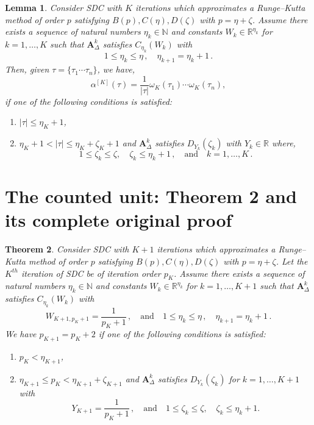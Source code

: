 \documentclass[10pt,a4paper]{amsart}
\newcommand{\reva}[1]{#1}%
\theoremstyle{plain}
\newtheorem{theorem}{Theorem}
\newtheorem{lemma}[theorem]{Lemma}
\theoremstyle{definition}
\theoremstyle{remark}
\begin{document}
\begin{lemma}\label{lemma:ai_gen_form}
    Consider SDC with $K$ iterations which approximates a \reva{Runge--Kutta method of order $p$ satisfying $B(p), C(\eta), D(\zeta)$ with $p = \eta + \zeta$. Assume there exists a sequence of natural numbers $\eta_k \in \mathbb{N}$ and constants $W_k \in \mathbb{R}^{\eta_k}$ for $k=1,\dots, K$ such that $\bm{A}^k_\Delta$ satisfies $C_{\eta_k}(W_k)$ with
    \[ 1 \leq \eta_k \leq \eta \,, \quad \eta_{k+1} = \eta_k + 1 \,. \]
    Then, given $\tau = \{\tau_1 \cdots \tau_n\}$, we have,
    \begin{equation}\label{eq:ai_gen_form}
        \alpha^{[K]} (\tau) = \frac{1}{|\tau|} \omega_K (\tau_1) \cdots \omega_K (\tau_n),
    \end{equation}
    if one of the following conditions is satisfied:
    \begin{enumerate}
        \item $|\tau| \leq \eta_K + 1$,
        \item $\eta_K + 1 < |\tau| \leq \eta_K + \zeta_K + 1$ and $\bm{A}_\Delta^k$ satisfies $D_{Y_k}(\zeta_k)$ with $Y_k \in \mathbb{R}$ where,
            \[ 1 \leq \zeta_k \leq \zeta, \quad \zeta_k \leq \eta_k + 1 \,, \quad \text{and} \quad k = 1, \dots, K \,. \]
    \end{enumerate}}
\end{lemma}


\section{The counted unit: Theorem 2 and its complete original proof}

\begin{theorem}
    \label{thm:order_jump}
    Consider SDC with $K+1$ iterations which approximates a \reva{Runge--Kutta method of order $p$ satisfying $B(p), C(\eta), D(\zeta)$ with $p = \eta + \zeta$. Let the $K^{th}$ iteration of SDC be of iteration order $p_K$. Assume there exists a sequence of natural numbers $\eta_k \in \mathbb{N}$ and constants $W_k \in \mathbb{R}^{\eta_k}$ for $k=1,\dots, K+1$ such that $\bm{A}^k_\Delta$ satisfies $C_{\eta_k}(W_k)$ with
    \[ W_{K+1,p_K + 1} = \frac{1}{p_K + 1} \,, \quad \text{and} \quad 1 \leq \eta_k \leq \eta \,, \quad \eta_{k+1} = \eta_k + 1 \,. \]
    We have $p_{K+1} = p_K + 2$ if one of the following conditions is satisfied:
    \begin{enumerate}
        \item $p_K < \eta_{K+1}$,
        \item $\eta_{K+1} \leq p_K < \eta_{K+1} + \zeta_{K+1}$ and $\bm{A}_\Delta^k$ satisfies $D_{Y_k}(\zeta_k)$ for $k = 1, \dots, K + 1$ with
            \[ Y_{K+1} = \frac{1}{p_K + 1} \,, \quad \text{and} \quad 1 \leq \zeta_k \leq \zeta, \quad \zeta_k \leq \eta_k + 1. \]
    \end{enumerate}}
\end{theorem}
\end{document}
